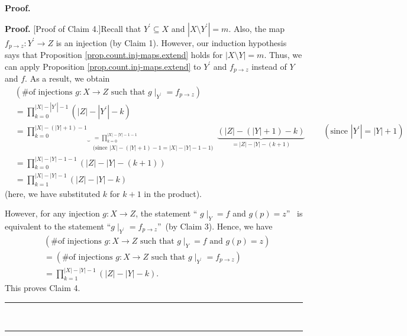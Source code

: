\documentclass[numbers=enddot,12pt,final,onecolumn,notitlepage]{scrartcl}%
\numberwithin{exer}{section}
\theoremstyle{definition}
\newenvironment{statement}{\begin{quote}}{\end{quote}}
\newenvironment{proof}[1][Proof]{\noindent\textbf{#1.} }{\ \rule{0.5em}{0.5em}}
\let\prodnonlimits\prod
\renewcommand{\prod}{\prodnonlimits\limits}
\newenvironment{verlong}{}{}
\begin{document}
\begin{verlong}
\begin{proof}
\begin{statement}
\end{statement}

\begin{proof}
[Proof of Claim 4.]Recall that $Y^{\prime}\subseteq X$ and $\left\vert
X\setminus Y^{\prime}\right\vert =m$. Also, the map $f_{p\rightarrow
z}:Y^{\prime}\rightarrow Z$ is an injection (by Claim 1). However, our
induction hypothesis says that Proposition \ref{prop.count.inj-maps.extend}
holds for $\left\vert X\setminus Y\right\vert =m$. Thus, we can apply
Proposition \ref{prop.count.inj-maps.extend} to $Y^{\prime}$ and
$f_{p\rightarrow z}$ instead of $Y$ and $f$. As a result, we obtain%
\begin{align*}
&  \left(  \text{\# of injections }g:X\rightarrow Z\text{ such that }\left.
g\mid_{Y^{\prime}}\right.  =f_{p\rightarrow z}\right) \\
&  =\prod_{k=0}^{\left\vert X\right\vert -\left\vert Y^{\prime}\right\vert
-1}\left(  \left\vert Z\right\vert -\left\vert Y^{\prime}\right\vert -k\right)
\\
&  =\underbrace{\prod_{k=0}^{\left\vert X\right\vert -\left(  \left\vert
Y\right\vert +1\right)  -1}}_{\substack{=\prod_{k=0}^{\left\vert X\right\vert
-\left\vert Y\right\vert -1-1}\\\text{(since }\left\vert X\right\vert -\left(
\left\vert Y\right\vert +1\right)  -1=\left\vert X\right\vert -\left\vert
Y\right\vert -1-1\text{)}}}\underbrace{\left(  \left\vert Z\right\vert
-\left(  \left\vert Y\right\vert +1\right)  -k\right)  }_{=\left\vert
Z\right\vert -\left\vert Y\right\vert -\left(  k+1\right)  }%
\ \ \ \ \ \ \ \ \ \ \left(  \text{since }\left\vert Y^{\prime}\right\vert
=\left\vert Y\right\vert +1\right) \\
&  =\prod_{k=0}^{\left\vert X\right\vert -\left\vert Y\right\vert -1-1}\left(
\left\vert Z\right\vert -\left\vert Y\right\vert -\left(  k+1\right)  \right)
\\
&  =\prod_{k=1}^{\left\vert X\right\vert -\left\vert Y\right\vert -1}\left(
\left\vert Z\right\vert -\left\vert Y\right\vert -k\right)
\end{align*}
(here, we have substituted $k$ for $k+1$ in the product).

However, for any injection $g:X\rightarrow Z$, the statement \textquotedblleft%
$\left.  g\mid_{Y}\right.  =f$ and $g\left(  p\right)  =z$\textquotedblright%
\ is equivalent to the statement \textquotedblleft$\left.  g\mid_{Y^{\prime}%
}\right.  =f_{p\rightarrow z}$\textquotedblright\ (by Claim 3). Hence, we
have
\begin{align*}
&  \left(  \text{\# of injections }g:X\rightarrow Z\text{ such that }\left.
g\mid_{Y}\right.  =f\text{ and }g\left(  p\right)  =z\right) \\
&  =\left(  \text{\# of injections }g:X\rightarrow Z\text{ such that }\left.
g\mid_{Y^{\prime}}\right.  =f_{p\rightarrow z}\right) \\
&  =\prod_{k=1}^{\left\vert X\right\vert -\left\vert Y\right\vert -1}\left(
\left\vert Z\right\vert -\left\vert Y\right\vert -k\right)  .
\end{align*}
This proves Claim 4.
\end{proof}


\end{proof}
\end{verlong}
\end{document}
